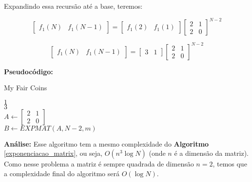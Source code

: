 Expandindo essa recursão até a base, teremos:

\[ 
\begin{bmatrix}
       f_1(N) & f_1(N-1)
\end{bmatrix}
=
\begin{bmatrix}
       f_1(2) & f_1(1)
\end{bmatrix}
\begin{bmatrix}
       2 & 1           \\[0.3em]
       2 & 0    
\end{bmatrix}^{N-2}
\]


\[ 
\begin{bmatrix}
       f_1(N) & f_1(N-1)
\end{bmatrix}
=
\begin{bmatrix}
       3 & 1
\end{bmatrix}
\begin{bmatrix}
       2 & 1           \\[0.3em]
       2 & 0    
\end{bmatrix}^{N-2}
\]
\clearpage

\textbf{Pseudocódigo:}
\begin{algorithm}
\caption{My Fair Coins}
\begin{algorithmic}[1]
\State \Return $1$
\EndIf
\\
\State \Return $3$
\EndIf
\\
\State $A \gets 
\begin{bmatrix}
2 & 1           \\[0.3em]
2 & 0
\end{bmatrix}
$
\\
\State $B \gets EXPMAT(A, N-2, m)$ 
\\
\State {}
\EndProcedure
\end{algorithmic}
\end{algorithm}

\textbf{Análise:}
Esse algoritmo tem a mesmo complexidade do \textbf{Algoritmo} \autoref{exponenciacao_matrix}, ou seja, $O(n^3 \log N)$ (onde $n$ é a dimensão da matriz).
Como nesse problema a matriz é sempre quadrada de dimensão $n=2$, temos que a complexidade final do algoritmo será $O(\log N)$.

